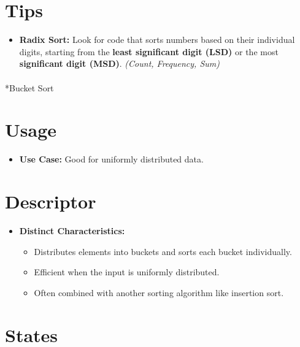 \documentclass[
  letterpaper,
  DIV=11,
  numbers=noendperiod]{scrreprt}
\makeatletter
\let\oldparagraph\paragraph
\renewcommand{\paragraph}{
    \@ifstar
      \xxxParagraphStar
      \xxxParagraphNoStar
  }
\newcommand{\xxxParagraphStar}[1]{\oldparagraph*{#1}\mbox{}}
\newcommand{\xxxParagraphNoStar}[1]{\oldparagraph{#1}\mbox{}}
\providecommand{\tightlist}{%
  \setlength{\itemsep}{0pt}\setlength{\parskip}{0pt}}
\makeatother
\begin{document}
\section{Tips}

\begin{itemize}
\tightlist
\item
  \textbf{Radix Sort:} Look for code that sorts numbers based on their
  individual digits, starting from the \textbf{least significant digit
  (LSD)} or the most \textbf{significant digit (MSD)}. \emph{(Count,
  Frequency, Sum)}
\end{itemize}

\paragraph*{Bucket Sort}\label{bucket-sort}

\section{Usage}

\begin{itemize}
\tightlist
\item
  \textbf{Use Case:} Good for uniformly distributed data.
\end{itemize}

\section{Descriptor}

\begin{itemize}
\item
  \textbf{Distinct Characteristics:}

  \begin{itemize}
  \tightlist
  \item
    Distributes elements into buckets and sorts each bucket
    individually.
  \item
    Efficient when the input is uniformly distributed.
  \item
    Often combined with another sorting algorithm like insertion sort.
  \end{itemize}
\end{itemize}

\section{States}
\end{document}
